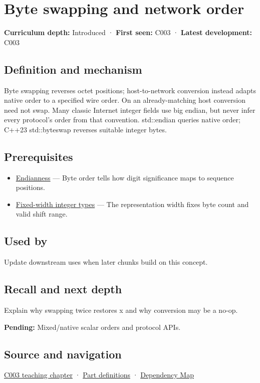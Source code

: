 \hypertarget{appendix-11ba36693aa2}{}\label{referencestart:appendix-11ba36693aa2}
\section{Byte swapping and network order}\label{appendix-11ba36693aa2-byte-swapping-and-network-order}

\textbf{Curriculum depth:} Introduced · \textbf{First seen:} C003 · \textbf{Latest development:} C003

\subsection{Definition and mechanism}\label{appendix-11ba36693aa2-definition-and-mechanism}

Byte swapping reverses octet positions; host-to-network conversion instead adapts native order to a specified wire order. On an already-matching host conversion need not swap. Many classic Internet integer fields use big endian, but never infer every protocol's order from that convention. std::endian queries native order; C++23 std::byteswap reverses suitable integer bytes.

\subsection{Prerequisites}\label{appendix-11ba36693aa2-prerequisites}

\begin{itemize}
\tightlist
\item
  \hyperref[appendix-bc07c3d25b18]{Endianness} --- Byte order tells how digit significance maps to sequence positions.
\item
  \hyperref[appendix-cc04044b5782]{Fixed-width integer types} --- The representation width fixes byte count and valid shift range.
\end{itemize}

\subsection{Used by}\label{appendix-11ba36693aa2-used-by}

Update downstream uses when later chunks build on this concept.

\subsection{Recall and next depth}\label{appendix-11ba36693aa2-recall-and-next-depth}

Explain why swapping twice restores x and why conversion may be a no-op.

\textbf{Pending:} Mixed/native scalar orders and protocol APIs.

\subsection{Source and navigation}\label{appendix-11ba36693aa2-source-and-navigation}

\hyperref[01-foundations-i-ch002-where-the-bytes-live]{C003 teaching chapter} · \hyperref[appendix-fd090d982a15-m003---parts-41-60]{Part definitions} · \hyperref[appendix-4ad47bdd269a]{Dependency Map}
